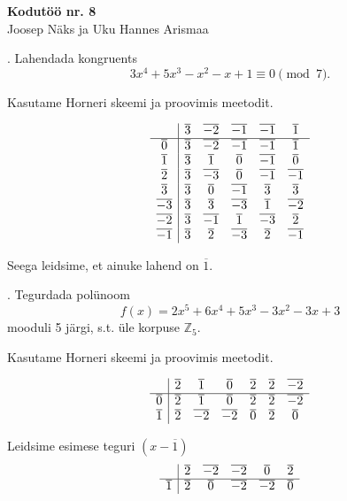 \documentclass[a4paper, 10pt]{article}
\newcommand{\Z}{\mathbb{Z}}
\newcommand{\w}{\overline}
\begin{document}
\begin{center}
\Large\textbf{Kodutöö nr. 8}\\
\small{Joosep Näks ja Uku Hannes Arismaa}
\end{center}

\bigskip

. Lahendada kongruents 
\[
3x^4 + 5 x^3 - x^2 - x +1\equiv 0\pmod{7}.
\]

\smallskip
Kasutame Horneri skeemi ja proovimis meetodit.

\begin{equation*}
\begin{array}{c| c c c c c }
&\w{3}&\w{-2}&\w{-1}&\w{-1}&\w{1}\\
\hline
\w{0}&\w{3}&\w{-2}&\w{-1}&\w{-1}&\w{1}\\
\w{1}&\w{3}&\w{1}&\w{0}&\w{-1}&\w{0}\\
\w{2}&\w{3}&\w{-3}&\w{0}&\w{-1}&\w{-1}\\
\w{3}&\w{3}&\w{0}&\w{-1}&\w{3}&\w{3}\\
\w{-3}&\w{3}&\w{3}&\w{-3}&\w{1}&\w{-2}\\
\w{-2}&\w{3}&\w{-1}&\w{1}&\w{-3}&\w{2}\\
\w{-1}&\w{3}&\w{2}&\w{-3}&\w{2}&\w{-1}\\

\end{array}
\end{equation*}

Seega leidsime, et ainuke lahend on $\w{1}$.
\bigskip


. Tegurdada pol\"unoom  
\[
f(x)=2x^5+6x^4+5x^3-3x^2-3x+3
\] 
mooduli 5 j\"argi, s.t. \"ule korpuse $\Z_{5}$.

\bigskip
Kasutame Horneri skeemi ja proovimis meetodit.

\begin{equation*}
\begin{array}{c| c c c c c c}
&\w{2}&\w{1}&\w{0}&\w{2}&\w{2}&\w{-2}\\
\hline
\w{0}&\w{2}&\w{1}&\w{0}&\w{2}&\w{2}&\w{-2}\\
\w{1}&\w{2}&\w{-2}&\w{-2}&\w{0}&\w{2}&\w{0}\\

\end{array}
\end{equation*}

\bigskip
Leidsime esimese teguri $(x-\w{1})$
\begin{equation*}
\begin{array}{c| c c c c c }
&\w{2}&\w{-2}&\w{-2}&\w{0}&\w{2}\\
\hline
\w{1}&\w{2}&\w{0}&\w{-2}&\w{-2}&\w{0}\\

\end{array}
\end{equation*}
\end{document}
